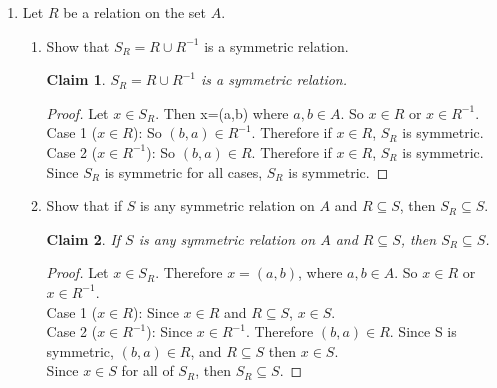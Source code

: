 \documentclass[11pt]{letter}
\newtheorem{claim}{Claim}
\theoremstyle{definition}
\begin{document}
\begin{description}
\begin{enumerate}
\begin{enumerate}
			\end{enumerate}
			
		\item Let $R$ be a relation on the set $A$.
			\begin{enumerate}
			\item Show that $S_R=R\cup R^{-1}$ is a symmetric relation.
                          \begin{claim}
                            $S_R=R\cup R^{-1}$ is a symmetric relation.
                          \end{claim}
                          \begin{proof}
                            Let $x\in S_R$. Then x=(a,b) where $a,b\in A$. So $x\in R$ or $x\in R^{-1}$.\\
                            Case 1 ($x\in R$): So $(b,a)\in R^{-1}$. Therefore if $x\in R$, $S_R$ is symmetric.\\
                            Case 2 ($x\in R^{-1}$): So $(b,a)\in R$. Therefore if $x\in R$, $S_R$ is symmetric.\\
                            Since $S_R$ is symmetric for all cases, $S_R$ is symmetric. 
                          \end{proof}
                          
			\item Show that if $S$ is any symmetric relation on $A$ and $R\subseteq S$, then $S_R\subseteq S$.
                          \begin{claim}
                            If $S$ is any symmetric relation on $A$ and $R\subseteq S$, then $S_R\subseteq S$.
                          \end{claim}
                          \begin{proof}
                            Let $x\in S_R$. Therefore $x=(a,b)$, where $a,b\in A$. So $x\in R$ or $x\in R^{-1}$.\\
                            Case 1 ($x\in R$): Since $x\in R$ and $R\subseteq S$, $x\in S$.\\
                            Case 2 ($x\in R^{-1}$): Since $x\in R^{-1}$. Therefore $(b,a)\in R$. Since S is symmetric, $(b,a)\in R$, and $R\subseteq S$ then $x\in S$.\\
                            Since $x\in S$ for all of $S_R$, then $S_R\subseteq S$.
                            
                          \end{proof}
                          

\end{enumerate}
\end{enumerate}
\end{description}
\end{document}
